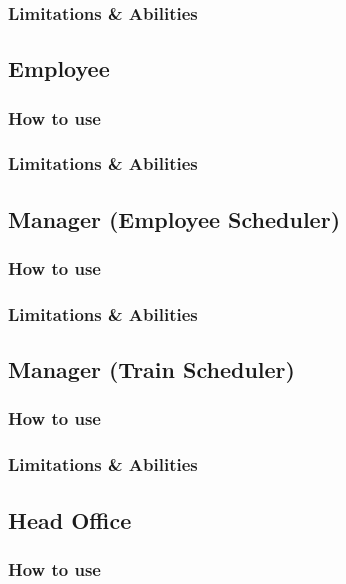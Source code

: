 \subsubsection{Limitations \& Abilities}



\subsection{Employee}
\subsubsection{How to use}

\subsubsection{Limitations \& Abilities}



\subsection{Manager (Employee Scheduler)}
\subsubsection{How to use}

\subsubsection{Limitations \& Abilities}



\subsection{Manager (Train Scheduler)}
\subsubsection{How to use}

\subsubsection{Limitations \& Abilities}



\subsection{Head Office}
\subsubsection{How to use}

